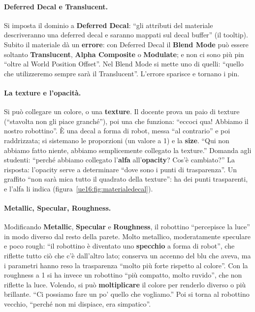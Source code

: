 \paragraph{Deferred Decal e Translucent.} Si imposta il dominio a \textbf{Deferred Decal}:
``gli attributi del materiale descriveranno una deferred decal e saranno mappati sul decal
buffer'' (il tooltip). Subito il materiale dà un \textbf{errore}: con Deferred Decal il
\textbf{Blend Mode} può essere soltanto \textbf{Translucent}, \textbf{Alpha Composite} o
\textbf{Modulate}; e non ci sono più pin ``oltre al World Position Offset''. Nel Blend Mode si
mette uno di quelli: ``quello che utilizzeremo sempre sarà il Translucent''. L'errore sparisce e
tornano i pin.

\paragraph{La texture e l'opacità.} Si può collegare un colore, o una \textbf{texture}. Il
docente prova un paio di texture (``stavolta non gli piace granché''), poi una che funziona:
``eccoci qua! Abbiamo il nostro robottino''. È una decal a forma di robot, messa ``al
contrario'' e poi raddrizzata; si sistemano le proporzioni (un valore a 1) e la
\textbf{size}. ``Qui non abbiamo fatto niente, abbiamo semplicemente collegato la texture.''
Domanda agli studenti: ``perché abbiamo collegato l'\textbf{alfa} all'\textbf{opacity}? Cos'è
cambiato?'' La risposta: l'opacity serve a determinare ``dove sono i punti di trasparenza''. Un
graffito ``non sarà mica tutto il quadrato della texture'': ha dei punti trasparenti, e
l'alfa li indica (figura~\ref{ue16:fig:materialedecal}).

\paragraph{Metallic, Specular, Roughness.} Modificando \textbf{Metallic}, \textbf{Specular} e
\textbf{Roughness}, il robottino ``percepisce la luce'' in modo diverso dal resto della parete.
Molto metallico, moderatamente speculare e poco rough: ``il robottino è diventato uno
\textbf{specchio} a forma di robot'', che riflette tutto ciò che c'è dall'altro lato; conserva
un accenno del blu che aveva, ma i parametri hanno reso la trasparenza ``molto più forte rispetto
al colore''. Con la roughness a 1 si ha invece un robottino ``più compatto, molto ruvido'', che
non riflette la luce. Volendo, si può \textbf{moltiplicare} il colore per renderlo diverso o più
brillante. ``Ci possiamo fare un po' quello che vogliamo.'' Poi si torna al robottino vecchio,
``perché non mi dispiace, era simpatico''.

